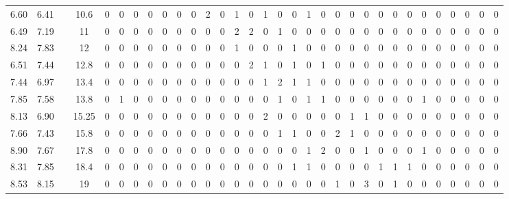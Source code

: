\begin{table*}[ht]
{\begin{tabular}{| c | c || c || c | cccccccccccccccccccccccccccc |}
		6.60 & 6.41 & \CCS & 10.6 & 0 & 0 & 0 & 0 & 0 & 0 & 0 & \cellcolor{black!35}2 & 0 & \cellcolor{black!25}1 & 0 & \cellcolor{black!25}1 & 0 & 0 & \cellcolor{black!25}1 & 0 & 0 & 0 & 0 & 0 & 0 & 0 & 0 & 0 & 0 & 0 & 0 & 0\\
		6.49 & 7.19 & \CW & 11 & 0 & 0 & 0 & 0 & 0 & 0 & 0 & 0 & 0 & \cellcolor{black!35}2 & \cellcolor{black!35}2 & 0 & \cellcolor{black!25}1 & 0 & 0 & 0 & 0 & 0 & 0 & 0 & 0 & 0 & 0 & 0 & 0 & 0 & 0 & 0\\
		8.24 & 7.83 & \DASP & 12 & 0 & 0 & 0 & 0 & 0 & 0 & 0 & 0 & 0 & \cellcolor{black!25}1 & 0 & 0 & 0 & \cellcolor{black!25}1 & 0 & 0 & 0 & 0 & 0 & 0 & 0 & 0 & 0 & 0 & 0 & 0 & 0 & 0\\
		6.51 & 7.44 & \W & 12.8 & 0 & 0 & 0 & 0 & 0 & 0 & 0 & 0 & 0 & 0 & \cellcolor{black!35}2 & \cellcolor{black!25}1 & 0 & \cellcolor{black!25}1 & 0 & \cellcolor{black!25}1 & 0 & 0 & 0 & 0 & 0 & 0 & 0 & 0 & 0 & 0 & 0 & 0\\
		7.44 & 6.97 & \WP & 13.4 & 0 & 0 & 0 & 0 & 0 & 0 & 0 & 0 & 0 & 0 & 0 & \cellcolor{black!25}1 & \cellcolor{black!35}2 & \cellcolor{black!25}1 & \cellcolor{black!25}1 & 0 & 0 & 0 & 0 & 0 & 0 & 0 & 0 & 0 & 0 & 0 & 0 & 0\\
		7.85 & 7.58 & \POISE & 13.8 & 0 & \cellcolor{black!25}1 & 0 & 0 & 0 & 0 & 0 & 0 & 0 & 0 & 0 & 0 & \cellcolor{black!25}1 & 0 & \cellcolor{black!25}1 & \cellcolor{black!25}1 & 0 & 0 & 0 & 0 & 0 & 0 & \cellcolor{black!25}1 & 0 & 0 & 0 & 0 & 0\\
		8.13 & 6.90 & \NC & 15.25 & 0 & 0 & 0 & 0 & 0 & 0 & 0 & 0 & 0 & 0 & 0 & \cellcolor{black!35}2 & 0 & 0 & 0 & 0 & 0 & \cellcolor{black!25}1 & \cellcolor{black!25}1 & 0 & 0 & 0 & 0 & 0 & 0 & 0 & 0 & 0\\
		7.66 & 7.43 & \MSS & 15.8 & 0 & 0 & 0 & 0 & 0 & 0 & 0 & 0 & 0 & 0 & 0 & 0 & \cellcolor{black!25}1 & \cellcolor{black!25}1 & 0 & 0 & \cellcolor{black!35}2 & \cellcolor{black!25}1 & 0 & 0 & 0 & 0 & 0 & 0 & 0 & 0 & 0 & 0\\
		8.90 & 7.67 & \VC & 17.8 & 0 & 0 & 0 & 0 & 0 & 0 & 0 & 0 & 0 & 0 & 0 & 0 & 0 & 0 & \cellcolor{black!25}1 & \cellcolor{black!35}2 & 0 & 0 & \cellcolor{black!25}1 & 0 & 0 & 0 & \cellcolor{black!25}1 & 0 & 0 & 0 & 0 & 0\\
		8.31 & 7.85 & \PB & 18.4 & 0 & 0 & 0 & 0 & 0 & 0 & 0 & 0 & 0 & 0 & 0 & 0 & 0 & \cellcolor{black!25}1 & \cellcolor{black!25}1 & 0 & 0 & 0 & 0 & \cellcolor{black!25}1 & \cellcolor{black!25}1 & \cellcolor{black!25}1 & 0 & 0 & 0 & 0 & 0 & 0\\
		8.53 & 8.15 & \FH & 19 & 0 & 0 & 0 & 0 & 0 & 0 & 0 & 0 & 0 & 0 & 0 & 0 & 0 & 0 & 0 & 0 & \cellcolor{black!25}1 & 0 & \cellcolor{black!45}3 & 0 & \cellcolor{black!25}1 & 0 & 0 & 0 & 0 & 0 & 0 & 0\\

\end{tabular}}
\end{table*}
